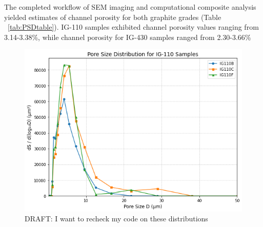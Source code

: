 \documentclass[review]{elsarticle}
\begin{document}
\begin{table}
  \centering
  \caption{Pore Size Distribution (PSD) and summary characteristics for IG-110 and IG-430 samples.}
  \label{tab:PSDtable}
\end{table}

The completed workflow of SEM imaging and computational composite analysis
yielded estimates of channel porosity for both graphite grades (Table
~\ref{tab:PSDtable}). IG-110 samples exhibited channel porosity values ranging
from 3.14-3.38\%, while channel porosity for IG-430 samples ranged from
2.30-3.66\%

\begin{figure}
    \centering
    \includegraphics[width=0.9\columnwidth]{./Media/IG110 ds LogD .png}
    \caption{DRAFT: I want to recheck my code on these distributions}
    \label{fig:IG110LogPSDs}
\end{figure}
\end{document}
